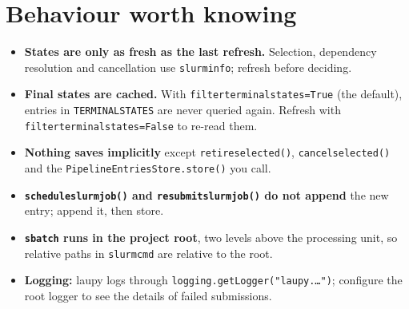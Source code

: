 \documentclass[11pt,a4paper]{article}
\DeclareRobustCommand{\_}{\textunderscore\allowbreak}
\newcommand{\cmd}[1]{\texttt{#1}}
\begin{document}
\section{Behaviour worth knowing}

\begin{itemize}
  \item \textbf{States are only as fresh as the last refresh.} Selection, dependency resolution and
    cancellation use \cmd{slurm\_info}; refresh before deciding.
  \item \textbf{Final states are cached.} With \cmd{filter\_terminal\_states=True} (the default),
    entries in \cmd{TERMINAL\_STATES} are never queried again. Refresh with
    \cmd{filter\_terminal\_states=False} to re-read them.
  \item \textbf{Nothing saves implicitly} except \cmd{retire\_selected()}, \cmd{cancel\_selected()}
    and the \cmd{PipelineEntriesStore.store()} you call.
  \item \textbf{\cmd{schedule\_slurm\_job()} and \cmd{resubmit\_slurm\_job()} do not append} the new
    entry; append it, then store.
  \item \textbf{\cmd{sbatch} runs in the project root}, two levels above the processing unit, so
    relative paths in \cmd{slurm\_cmd} are relative to the root.
  \item \textbf{Logging:} laupy logs through \cmd{logging.getLogger("laupy.\ldots")}; configure the
    root logger to see the details of failed submissions.
\end{itemize}
\end{document}
